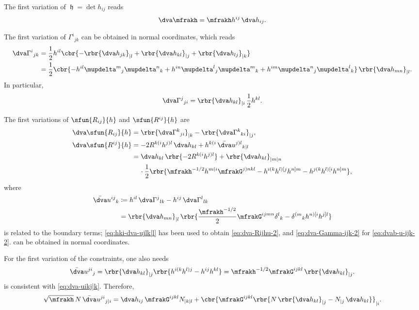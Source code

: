 \documentclass[a4paper,11pt]{article}
\begin{document}
The first variation of $\mfrakh = \det h_{ij}$ reads
\begin{align}
\dva \mfrakh = \mfrakh h^{ij}\,\dva h_{ij}.
\end{align}

The first variation of $\Gamma^i{}_{jk}$ can be obtained in normal coordinates,
which reads
\begin{align}
\dva \Gamma^{i}{}_{jk} &= \frac{1}{2} h^{il}
\cbr{-\rbr{\dva h_{jk}}_{|l} + \rbr{\dva h_{kl}}_{|j} + \rbr{\dva h_{lj}}_{|k}}
\\
&= \frac{1}{2} \cbr{-h^{il}\mupdelta^m{}_j\mupdelta^n{}_k
+h^{in}\mupdelta^l{}_j\mupdelta^m{}_k
+h^{im}\mupdelta^n{}_j\mupdelta^l{}_k}\,\rbr{\dva h_{mn}}_{|l}.
\label{eq:dva-Gamma-ijk-2}
\end{align}
In particular,
\begin{align}
\dva \Gamma^j{}_{ji} = \rbr{\dva h_{kl}}_{|i}\,\frac{1}{2}h^{kl}.
\end{align}


The first variations of $\sfun{R_{ij}}{h}$ and $\sfun{R^{ij}}{h}$ are
\begin{align}
\dva \sfun{R_{ij}}{h} &=
\rbr{\dva\Gamma^k{}_{ji}}_{|k} - \rbr{\dva\Gamma^k{}_{ki}}_{|j},
\label{eq:dva-Rij-low}
\\
\dva \sfun{R^{ij}}{h} &=
-2R^{k(i}h^{j)l}\,\dva h_{kl} + h^{k(i}\,\bar{\dva}u^{j)l}{}_{k|l}
\label{eq:var-Rijhu} \\
&= \dva h_{kl}\,\rbr{-2R^{k(i}h^{j)l}} + \rbr{\dva h_{kl}}_{|m|n}
\nonumber \\
&\quad\,\cdot
\frac{1}{2} \rbr{ \mfrakh^{-1/2} h^{m(i} \mfrakG^{j)nkl}
- h^{i(k}h^{l)[j}h^{n]m} - h^{j(k}h^{l)[i}h^{n]m}},
\label{eq:dva-Rijhu-2}
\end{align}
where
\begin{align}
\bar{\dva}u^{ij}{}_{k} &\coloneqq
h^{il}\,\dva\Gamma^{j}{}_{lk} - h^{ij}\,\dva\Gamma^{l}{}_{lk}
\\
&= \rbr{\dva h_{mn}}_{|l}\,\rbr{
\frac{\mfrakh^{-1/2}}{2} \mfrakG^{ijmn} \delta^{l}{}_{k} -
\delta^{(m}{}_{k}h^{n)[i}h^{j]l}}
\label{eq:dvab-u-ijk-2}
\end{align}
is related to the boundary terms; \cref{eq:hki-dva-ujlk|l} has been used
to obtain \cref{eq:dva-Rijhu-2}, and \cref{eq:dva-Gamma-ijk-2} for 
\cref{eq:dvab-u-ijk-2}.  can be obtained in normal 
coordinates.

For the first variation of the constraints, one also needs
\begin{align}
\bar{\dva}u^{ji}{}_{j} = \rbr{\dva h_{kl}}_{|j}
\rbr{h^{i(k}h^{l)j}-h^{ij}h^{kl}}
= \mfrakh^{-1/2}\mfrakG^{ijkl}\,\rbr{\dva h_{kl}}_{|j}.
\label{eq:dva-ujij}
\end{align}
 is consistent with \cref{eq:dva-uikj|k}.
Therefore, 
\begin{align}
\sqrt{\mfrakh}\,N \,\bar{\dva}u^{ji}{}_{j|i} =
\dva h_{ij}\,\mfrakG^{ijkl}N_{|k|l}
+\cbr{\mfrakG^{ijkl}
\rbr{N\,\rbr{\dva h_{kl}}_{|j} - N_{|j}\,\dva h_{kl}} }_{|i}.
\end{align}
\end{document}
